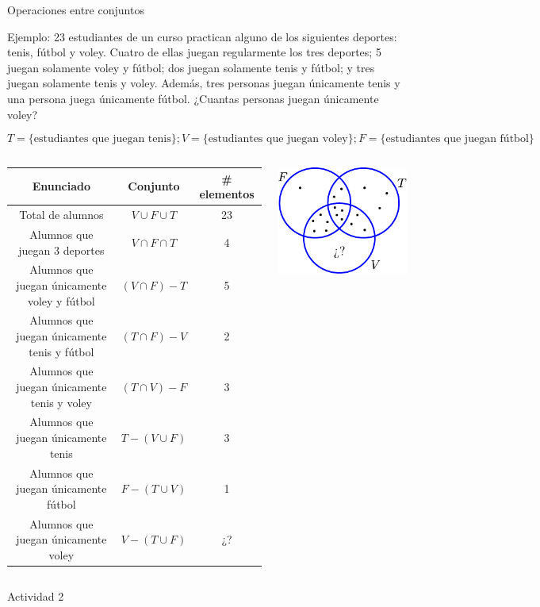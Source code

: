 \documentclass[9pt, aspectratio=169]{beamer}
\begin{document}
\begin{frame}{Operaciones entre conjuntos}
\begin{block}{Ejemplo:}
23 estudiantes de un curso practican alguno de los siguientes deportes: tenis, fútbol y voley. Cuatro de ellas juegan regularmente los tres deportes; 5 juegan solamente voley y fútbol; dos juegan solamente tenis y fútbol; y tres juegan solamente tenis y voley. Además, tres personas juegan únicamente tenis y una persona juega únicamente fútbol. ¿Cuantas personas juegan únicamente voley?
\vspace{-2.5em}
\begin{center}
\[ T = \{\text{estudiantes que juegan tenis}\}; V = \{\text{estudiantes que juegan voley}\}; F = \{\text{estudiantes que juegan fútbol}\} \]
\end{center}
\end{block} \pause
\begin{columns}[c]
{\small
\begin{tabular}{ccc}
\toprule
\textbf{Enunciado} & \textbf{Conjunto} & \textbf{\# elementos} \\
\midrule
Total de alumnos & $V \cup F \cup T$ & 23 \\
Alumnos que juegan 3 deportes & $V \cap F \cap T$ & 4 \\
Alumnos que juegan únicamente voley y fútbol& $(V \cap F) - T$ & 5 \\
Alumnos que juegan únicamente tenis y fútbol& $(T \cap F) - V$ & 2 \\
Alumnos que juegan únicamente tenis y voley& $(T \cap V) - F$ & 3 \\
Alumnos que juegan únicamente tenis& $T - (V \cup F) $ & 3 \\
Alumnos que juegan únicamente fútbol& $F - (T \cup V) $ & 1 \\
Alumnos que juegan únicamente voley& $V - (T \cup F) $ & ¿? \\
\bottomrule
\end{tabular}
}
\begin{center}
    \includegraphics[scale=1.0]{figs/fig-06.pdf}
\end{center}
\end{columns}
\pause

\begin{center}
{\Large \faArrowCircleRight \faPen* Actividad 2}
\end{center}
\end{frame}
\end{document}
